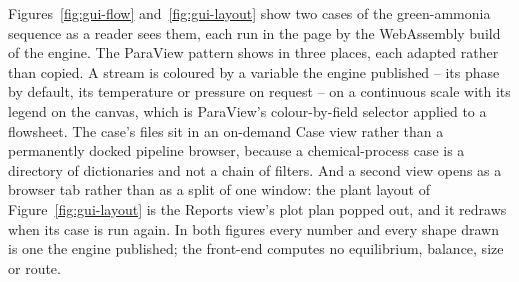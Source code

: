 \documentclass[11pt,a4paper]{article}
\begin{document}
Figures~\ref{fig:gui-flow} and~\ref{fig:gui-layout} show two cases of the
green-ammonia sequence as a reader sees them, each run in the page by the
WebAssembly build of the engine.  The ParaView pattern shows in three
places, each adapted rather than copied.  A stream is coloured by a
variable the engine published -- its phase by default, its temperature or
pressure on request -- on a continuous scale with its legend on the
canvas, which is ParaView's colour-by-field selector applied to a
flowsheet.  The case's files sit in an on-demand Case view rather than a
permanently docked pipeline browser, because a chemical-process case is a
directory of dictionaries and not a chain of filters.  And a second view
opens as a browser tab rather than as a split of one window: the plant
layout of Figure~\ref{fig:gui-layout} is the Reports view's plot plan
popped out, and it redraws when its case is run again.  In both figures
every number and every shape drawn is one the engine published; the
front-end computes no equilibrium, balance, size or route.
\end{document}
